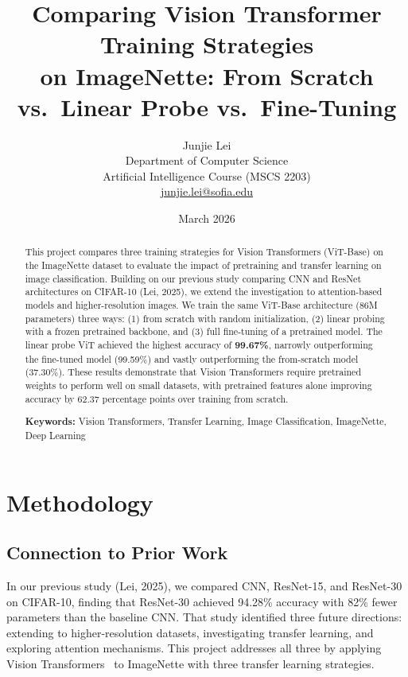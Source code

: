 \documentclass[12pt]{article}
\title{Comparing Vision Transformer Training Strategies\\on ImageNette: From Scratch vs.\ Linear Probe vs.\ Fine-Tuning}
\author{Junjie Lei\\
Department of Computer Science\\
Artificial Intelligence Course (MSCS 2203)\\
\href{mailto:junjie.lei@sofia.edu}{junjie.lei@sofia.edu}}
\date{March 2026}
\begin{document}
\maketitle

\begin{abstract}
This project compares three training strategies for Vision Transformers (ViT-Base) on the ImageNette dataset to evaluate the impact of pretraining and transfer learning on image classification. Building on our previous study comparing CNN and ResNet architectures on CIFAR-10 (Lei, 2025), we extend the investigation to attention-based models and higher-resolution images. We train the same ViT-Base architecture (86M parameters) three ways: (1) from scratch with random initialization, (2) linear probing with a frozen pretrained backbone, and (3) full fine-tuning of a pretrained model. The linear probe ViT achieved the highest accuracy of \textbf{99.67\%}, narrowly outperforming the fine-tuned model (99.59\%) and vastly outperforming the from-scratch model (37.30\%). These results demonstrate that Vision Transformers require pretrained weights to perform well on small datasets, with pretrained features alone improving accuracy by 62.37 percentage points over training from scratch.

\textbf{Keywords:} Vision Transformers, Transfer Learning, Image Classification, ImageNette, Deep Learning
\end{abstract}

\section{Methodology}

\subsection{Connection to Prior Work}

In our previous study (Lei, 2025), we compared CNN, ResNet-15, and ResNet-30 on CIFAR-10, finding that ResNet-30 achieved 94.28\% accuracy with 82\% fewer parameters than the baseline CNN. That study identified three future directions: extending to higher-resolution datasets, investigating transfer learning, and exploring attention mechanisms. This project addresses all three by applying Vision Transformers~\cite{dosovitskiy2020} to ImageNette with three transfer learning strategies.
\end{document}

